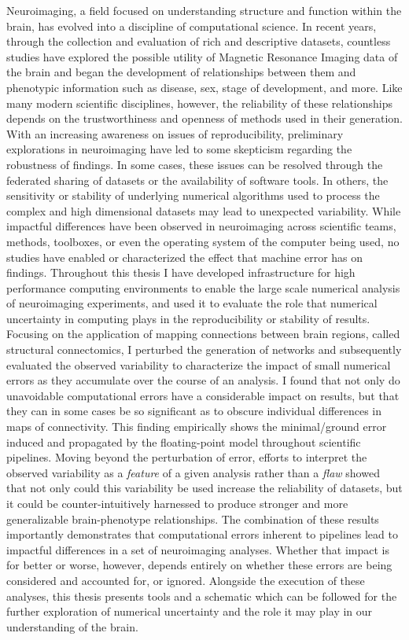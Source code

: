 Neuroimaging, a field focused on understanding structure and function within the brain, has evolved into a
discipline of computational science. In recent years, through the collection and evaluation of rich and
descriptive datasets, countless studies have explored the possible utility of Magnetic Resonance Imaging data
of the brain and began the development of relationships between them and phenotypic information such as
disease, sex, stage of development, and more. Like many modern scientific disciplines, however, the
reliability of these relationships depends on the trustworthiness and openness of methods used in their
generation. With an increasing awareness on issues of reproducibility, preliminary explorations in
neuroimaging have led to some skepticism regarding the robustness of findings. In some cases, these issues
can be resolved through the federated sharing of datasets or the availability of software tools. In others,
the sensitivity or stability of underlying numerical algorithms used to process the complex and high
dimensional datasets may lead to unexpected variability. While impactful differences have been observed in
neuroimaging across scientific teams, methods, toolboxes, or even the operating system of the computer being
used, no studies have enabled or characterized the effect that machine error has on findings. Throughout
this thesis I have developed infrastructure for high performance computing environments to enable the large
scale numerical analysis of neuroimaging experiments, and used it to evaluate the role that numerical
uncertainty in computing plays in the reproducibility or stability of results. Focusing on the application of
mapping connections between brain regions, called structural connectomics, I perturbed the generation of
networks and subsequently evaluated the observed variability to characterize the impact of small numerical
errors as they accumulate over the course of an analysis. I found that not only do unavoidable computational
errors have a considerable impact on results, but that they can in some cases be so significant as to obscure
individual differences in maps of connectivity. This finding empirically shows the minimal/ground error
induced and propagated by the floating-point model throughout scientific pipelines. Moving beyond the
perturbation of error, efforts to interpret the observed variability as a \textit{feature} of a given analysis
rather than a \textit{flaw} showed that not only could this variability be used increase the reliability of
datasets, but it could be counter-intuitively harnessed to produce stronger and more generalizable
brain-phenotype relationships. The combination of these results importantly demonstrates that computational
errors inherent to pipelines lead to impactful differences in a set of neuroimaging analyses. Whether that
impact is for better or worse, however, depends entirely on whether these errors are being considered and
accounted for, or ignored. Alongside the execution of these analyses, this thesis presents tools and a
schematic which can be followed for the further exploration of numerical uncertainty and the role it may play
in our understanding of the brain.

